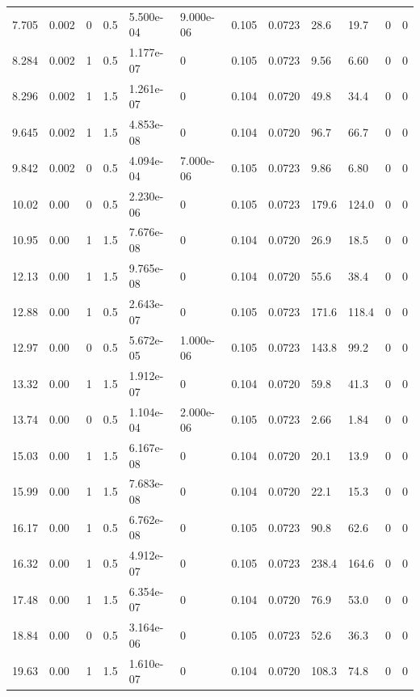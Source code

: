 \documentclass[preview]{standalone}
\begin{document}
{{\begin{tabular}{L{1.2cm}C{1.2cm} C{0.3cm}C{0.5cm} C{1.4cm}C{1.4cm} C{1.4cm}C{1.4cm} C{1.6cm}C{1.6cm} C{1.6cm}C{1.6cm}}
  7.705  &  0.002  & 0     & 0.5 &  5.500e-04  & 9.000e-06  &  0.105&   0.0723& 28.6 & 19.7   &  0 & 0  \\ 
  8.284  &  0.002  & 1     & 0.5 &  1.177e-07  & 0  &  0.105&   0.0723& 9.56 & 6.60   &  0 & 0  \\ 
  8.296  &  0.002  & 1     & 1.5 &  1.261e-07  & 0  &  0.104&   0.0720& 49.8 & 34.4   &  0 & 0  \\ 
  9.645  &  0.002  & 1     & 1.5 &  4.853e-08  & 0  &  0.104&   0.0720& 96.7 & 66.7   &  0 & 0  \\ 
  9.842  &  0.002  & 0     & 0.5 &  4.094e-04  & 7.000e-06  &  0.105&   0.0723& 9.86 & 6.80   &  0 & 0  \\ 
  10.02  &  0.00  & 0     & 0.5 &  2.230e-06  & 0  &  0.105&   0.0723& 179.6 & 124.0   &  0 & 0  \\ 
  10.95  &  0.00  & 1     & 1.5 &  7.676e-08  & 0  &  0.104&   0.0720& 26.9 & 18.5   &  0 & 0  \\ 
  12.13  &  0.00  & 1     & 1.5 &  9.765e-08  & 0  &  0.104&   0.0720& 55.6 & 38.4   &  0 & 0  \\ 
  12.88  &  0.00  & 1     & 0.5 &  2.643e-07  & 0  &  0.105&   0.0723& 171.6 & 118.4   &  0 & 0  \\ 
  12.97  &  0.00  & 0     & 0.5 &  5.672e-05  & 1.000e-06  &  0.105&   0.0723& 143.8 & 99.2   &  0 & 0  \\ 
  13.32  &  0.00  & 1     & 1.5 &  1.912e-07  & 0  &  0.104&   0.0720& 59.8 & 41.3   &  0 & 0  \\ 
  13.74  &  0.00  & 0     & 0.5 &  1.104e-04  & 2.000e-06  &  0.105&   0.0723& 2.66 & 1.84   &  0 & 0  \\ 
  15.03  &  0.00  & 1     & 1.5 &  6.167e-08  & 0  &  0.104&   0.0720& 20.1 & 13.9   &  0 & 0  \\ 
  15.99  &  0.00  & 1     & 1.5 &  7.683e-08  & 0  &  0.104&   0.0720& 22.1 & 15.3   &  0 & 0  \\ 
  16.17  &  0.00  & 1     & 0.5 &  6.762e-08  & 0  &  0.105&   0.0723& 90.8 & 62.6   &  0 & 0  \\ 
  16.32  &  0.00  & 1     & 0.5 &  4.912e-07  & 0  &  0.105&   0.0723& 238.4 & 164.6   &  0 & 0  \\ 
  17.48  &  0.00  & 1     & 1.5 &  6.354e-07  & 0  &  0.104&   0.0720& 76.9 & 53.0   &  0 & 0  \\ 
  18.84  &  0.00  & 0     & 0.5 &  3.164e-06  & 0  &  0.105&   0.0723& 52.6 & 36.3   &  0 & 0  \\ 
  19.63  &  0.00  & 1     & 1.5 &  1.610e-07  & 0  &  0.104&   0.0720& 108.3 & 74.8   &  0 & 0  \\ 

\end{tabular}}}
\end{document}
